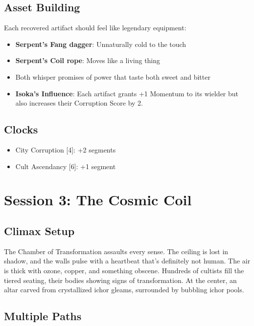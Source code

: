 \documentclass[11pt]{article}
\begin{document}
\subsection{Asset Building}

Each recovered artifact should feel like legendary equipment:
\begin{itemize}[leftmargin=*]
    \item \textbf{Serpent's Fang dagger}: Unnaturally cold to the touch
    \item \textbf{Serpent's Coil rope}: Moves like a living thing
    \item Both whisper promises of power that taste both sweet and bitter
    \item \textbf{Isoka's Influence}: Each artifact grants +1 Momentum to its wielder but also increases their Corruption Score by 2.
\end{itemize}

\subsection{Clocks}
\begin{itemize}[leftmargin=*]
    \item City Corruption [4]: +2 segments
    \item Cult Ascendancy [6]: +1 segment
\end{itemize}

\newpage

\section{Session 3: The Cosmic Coil}

\subsection{Climax Setup}

The Chamber of Transformation assaults every sense. The ceiling is lost in shadow, and the walls pulse with a heartbeat that's definitely not human. The air is thick with ozone, copper, and something obscene. Hundreds of cultists fill the tiered seating, their bodies showing signs of transformation. At the center, an altar carved from crystallized ichor gleams, surrounded by bubbling ichor pools.

\subsection{Multiple Paths}
\end{document}
